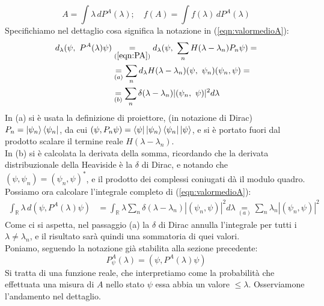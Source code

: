 \documentclass[../../FisicaTeorica.tex]{subfiles}
\begin{document}
\begin{equation}
A=\int \lambda\, dP^A(\lambda); \quad f(A) = \int f(\lambda)\,dP^A(\lambda)
\label{eqn:operatoreformale}
\end{equation}
Specifichiamo nel dettaglio cosa significa la notazione in (\ref{eqn:valormedioA}):
\begin{align}
d_\lambda (\psi,\ P^A (\lambda )\psi )&\underset{(\ref{eqn:PA})}{=}d_\lambda (\psi,\ \sum_{n} H(\lambda-\lambda_n )P_n\psi )=\nonumber\\
&\underset{(a)}{=}\sum_{n} d_\lambda H (\lambda-\lambda_n ) (\psi,\ \psi_n ) (\psi_n,\psi )=
\label{eqn:dPA_op}
\\
&\underset{(b)}{=}\sum_n \delta (\lambda-\lambda_n ) |(\psi_n,\ \psi)|^2 d\lambda\nonumber
\end{align}
In (a) si è usata la definizione di proiettore, (in notazione di Dirac) $P_n = \Ket{\psi_n}\Bra{\psi_n}$, da cui $(\psi, P_n \psi) = \Bra{\psi}\Ket{\psi_n}\Bra{\psi_n}\Ket{\psi}$, e si è portato fuori dal prodotto scalare il termine reale $H(\lambda-\lambda_n)$.\\
In (b) si è calcolata la derivata della somma, ricordando che la derivata distribuzionale della Heaviside è la $\delta$ di Dirac, e notando che $(\psi, \psi_n) = (\psi_n,\psi)^*$, e il prodotto dei complessi coniugati dà il modulo quadro.\\
Possiamo ora calcolare l'integrale completo di (\ref{eqn:valormedioA}):
\begin{align*}
\int_{\mathbb{R}}\lambda\,d (\psi,P^A (\lambda )\psi )&=\int_{\mathbb{R}}\lambda\sum_{n}\delta (\lambda-\lambda_n )
 |(\psi_n,\psi)|^2 d\lambda\underset{(a)}{=}\sum_{n}\lambda_n |(\psi_n,\psi)|^2
\end{align*}
Come ci si aspetta, nel passaggio (a) la $\delta$ di Dirac annulla l'integrale per tutti i $\lambda\neq \lambda_n$, e il risultato sarà quindi una sommatoria di quei valori.\\
Poniamo, seguendo la notazione già stabilita alla sezione precedente:
\[ 
P_\psi^A(\lambda) = (\psi, P^A(\lambda)\psi)
\]
Si tratta di una funzione reale, che interpretiamo come la probabilità che effettuata una misura di $A$ nello stato $\psi$ essa abbia un valore $\leq \lambda$. Osserviamone l'andamento nel dettaglio.
\end{document}
